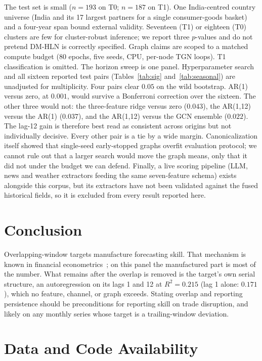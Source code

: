 \documentclass[10pt]{article}
\begin{document}
The test set is small ($n=193$ on T0; $n=187$ on T1). One India-centred country universe (India and its 17 largest partners for a single consumer-goods basket) and a four-year span bound external validity. Seventeen (T1) or eighteen (T0) clusters are few for cluster-robust inference; we report three $p$-values and do not pretend DM-HLN is correctly specified. Graph claims are scoped to a matched compute budget (80 epochs, five seeds, CPU, per-node TGN loops). T1 classification is omitted. The horizon sweep is one panel. Hyperparameter search and all sixteen reported test pairs (Tables~\ref{tab:sig} and~\ref{tab:seasonal}) are unadjusted for multiplicity. Four pairs clear $0.05$ on the wild bootstrap. AR(1) versus zero, at $0.001$, would survive a Bonferroni correction over the sixteen. The other three would not: the three-feature ridge versus zero ($0.043$), the AR(1,12) versus the AR(1) ($0.037$), and the AR(1,12) versus the GCN ensemble ($0.022$). The lag-12 gain is therefore best read as consistent across origins but not individually decisive. Every other pair is a tie by a wide margin. Canonicalization itself showed that single-seed early-stopped graphs overfit evaluation protocol; we cannot rule out that a larger search would move the graph means, only that it did not under the budget we can defend. Finally, a live scoring pipeline (LLM, news and weather extractors feeding the same seven-feature schema) exists alongside this corpus, but its extractors have not been validated against the fused historical fields, so it is excluded from every result reported here.

\section{Conclusion}
\label{sec:concl}

Overlapping-window targets manufacture forecasting skill. That mechanism is known in financial econometrics~\citep{ref29,ref32}; on this panel the manufactured part is most of the number. What remains after the overlap is removed is the target's own serial structure, an autoregression on its lags 1 and 12 at $R^2=0.215$ (lag 1 alone: $0.171$), which no feature, channel, or graph exceeds. Stating overlap and reporting persistence should be preconditions for reporting skill on trade disruption, and likely on any monthly series whose target is a trailing-window deviation.

\section*{Data and Code Availability}
\end{document}
